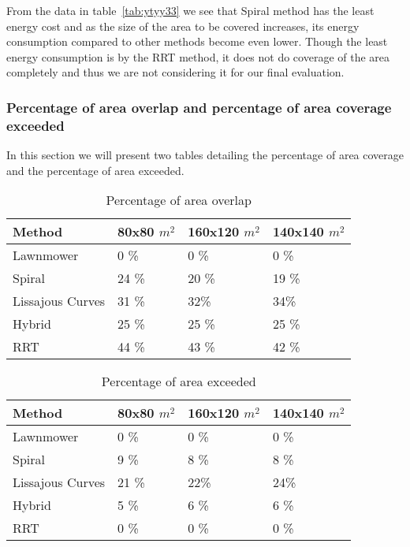 From the data in table~\ref{tab:ytyy33} we see that Spiral method has the least energy cost and as the size of the area to be covered increases, its energy consumption compared to other methods become even lower. Though the least energy consumption is by the RRT method, it does not do coverage of the area completely and thus we are not considering it for our final evaluation.

\subsubsection{Percentage of area overlap and percentage of area coverage exceeded}

In this section we will present two tables detailing the percentage of area coverage and the percentage of area exceeded. 

\begin{table}[htbp]
\centering
\caption{Percentage of area overlap}
\label{tab:ovr5656}
\begin{tabular}{|l|l|l|l|}
																		\\ \hline
Method           & 80x80 $m^{2}$ & 160x120 $m^{2}$ & 140x140 $m^{2}$		 \\ \hline
Lawnmower        & 0 \%             & 0 \%         & 0 \%                   \\ \hline
Spiral           & 24 \%            & 20 \%         & 19 \%                  \\ \hline
Lissajous Curves & 31 \%            & 32\%         & 34\%                     \\ \hline
Hybrid           & 25 \%            & 25 \%         & 25 \%                    \\ \hline
RRT              & 44 \%            & 43 \%         & 42 \%                     \\ \hline
\end{tabular}
\end{table}

\begin{table}[htbp]
\centering
\caption{Percentage of area exceeded}
\label{tab:exc56256}
\begin{tabular}{|l|l|l|l|}
																		\\ \hline
Method           & 80x80 $m^{2}$ & 160x120 $m^{2}$ & 140x140 $m^{2}$		 \\ \hline
Lawnmower        & 0 \%             & 0 \%         & 0 \%                   \\ \hline
Spiral           & 9 \%             & 8 \%        & 8 \%                     \\ \hline
Lissajous Curves & 21 \%            & 22\%         & 24\%                     \\ \hline
Hybrid           & 5 \%             & 6 \%        & 6 \%                       \\ \hline
RRT              & 0 \%             & 0 \%        & 0 \%                        \\ \hline
\end{tabular}
\end{table}

